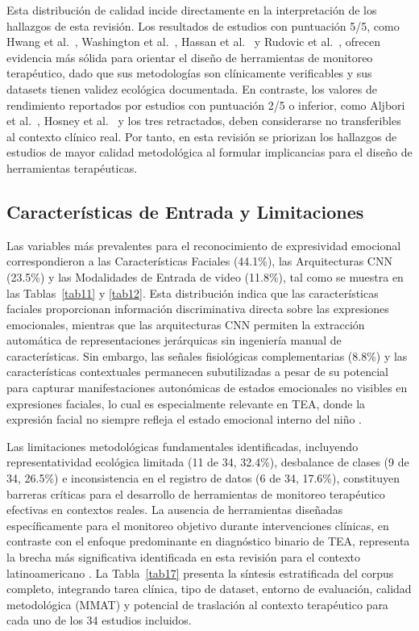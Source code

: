 \documentclass[3p,twocolumn,times]{elsarticle}
\begin{document}
	Esta distribución de calidad incide directamente en la interpretación de los hallazgos
	de esta revisión. Los resultados de estudios con puntuación 5/5, como
	Hwang et al.\ \cite{Hwang2024}, Washington et al.\ \cite{Washington2022}, Hassan
	et al.\ \cite{Hassan2025} y Rudovic et al.\ \cite{Rudovic2018,Rudovic2019}, ofrecen
	evidencia más sólida para orientar el diseño de herramientas de monitoreo
	terapéutico, dado que sus metodologías son clínicamente verificables y sus datasets
	tienen validez ecológica documentada. En contraste, los valores de rendimiento
	reportados por estudios con puntuación 2/5 o inferior, como Aljbori et al.\
	\cite{Aljbori2025}, Hosney et al.\ \cite{Hosney2024} y los tres retractados, deben
	considerarse no transferibles al contexto clínico real. Por tanto, en esta revisión
	se priorizan los hallazgos de estudios de mayor calidad metodológica al formular
	implicancias para el diseño de herramientas terapéuticas.
	
	\subsection{Características de Entrada y Limitaciones}\label{sec6c}
	
	Las variables más prevalentes para el reconocimiento de expresividad emocional
	correspondieron a las Características Faciales (44.1\%), las Arquitecturas CNN
	(23.5\%) y las Modalidades de Entrada de video (11.8\%), tal como se muestra en
	las Tablas~\ref{tab11} y \ref{tab12}. Esta distribución indica que las
	características faciales proporcionan información discriminativa directa sobre las
	expresiones emocionales, mientras que las arquitecturas CNN permiten la extracción
	automática de representaciones jerárquicas sin ingeniería manual de características.
	Sin embargo, las señales fisiológicas complementarias (8.8\%) y las características
	contextuales permanecen subutilizadas a pesar de su potencial para capturar
	manifestaciones autonómicas de estados emocionales no visibles en expresiones
	faciales, lo cual es especialmente relevante en TEA, donde la expresión facial no siempre refleja el estado emocional interno del niño
	\cite{Rudovic2018,Rudovic2019}.
	
	Las limitaciones metodológicas fundamentales identificadas, incluyendo
	representatividad ecológica limitada (11 de 34, 32.4\%), desbalance de clases (9
	de 34, 26.5\%) e inconsistencia en el registro de datos (6 de 34, 17.6\%),
	constituyen barreras críticas para el desarrollo de herramientas de monitoreo
	terapéutico efectivas en contextos reales. La ausencia de herramientas diseñadas
	específicamente para el monitoreo objetivo durante intervenciones clínicas, en
	contraste con el enfoque predominante en diagnóstico binario de TEA, representa la
	brecha más significativa identificada en esta revisión para el contexto
	latinoamericano \cite{Ahmad2024,Alsubai2025}. La Tabla~\ref{tab17} presenta la
	síntesis estratificada del corpus completo, integrando tarea clínica, tipo de
	dataset, entorno de evaluación, calidad metodológica (MMAT) y potencial de
	traslación al contexto terapéutico para cada uno de los 34 estudios incluidos.
	
\end{document}
